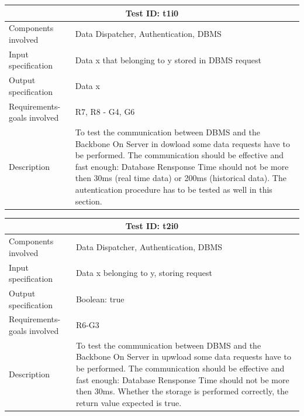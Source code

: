 \begin{table}[H]
\centering
\begin{tabular}{ |p{4.5cm}||p{11cm}|  }
 \hline
 \multicolumn{2}{|c|}{Test ID: t1i0} \\

 \hline 
 Components involved  	& 	 Data Dispatcher, Authentication, DBMS\\
 Input specification  	& 	  Data x that belonging to y stored in DBMS request\\
Output specification  	& 	 Data x\\
Requirements-goals involved & R7, R8 - G4, G6\\
Description  	& 	To test the communication between DBMS and the Backbone On Server in dowload some data requests have to be performed. The communication should be effective and fast enough: Database Rensponse Time should not be more then 30ms (real time data) or 200ms (historical data). The autentication procedure has to be tested as well in this section.\\
 \hline
\end{tabular}
\end{table}
\begin{table}[H]
\centering
\begin{tabular}{ |p{4.5cm}||p{11cm}|  }
 \hline
 \multicolumn{2}{|c|}{Test ID: t2i0} \\
 
 \hline 
 Components involved  	& 	 Data Dispatcher, Authentication, DBMS\\
 Input specification  	& 	  Data x belonging to y, storing request\\
Output specification  	& 	Boolean: true\\
Requirements-goals involved & R6-G3\\
Description  	& 	 To test the communication between DBMS and the Backbone On Server in upwload some data requests have to be performed. The communication should be effective and fast enough: Database Rensponse Time should not be more then 30ms. Whether the storage is performed correctly, the return value expected is true.\\
 \hline
\end{tabular}
\end{table}
